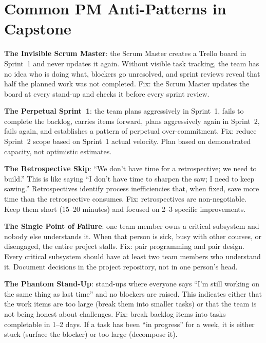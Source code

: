 \section{Common PM Anti-Patterns in Capstone}
\textbf{The Invisible Scrum Master}: the Scrum Master creates a Trello board in Sprint~1 and never updates it again. Without visible task tracking, the team has no idea who is doing what, blockers go unresolved, and sprint reviews reveal that half the planned work was not completed. Fix: the Scrum Master updates the board at every stand-up and checks it before every sprint review.

\textbf{The Perpetual Sprint~1}: the team plans aggressively in Sprint~1, fails to complete the backlog, carries items forward, plans aggressively again in Sprint~2, fails again, and establishes a pattern of perpetual over-commitment. Fix: reduce Sprint~2 scope based on Sprint~1 actual velocity. Plan based on demonstrated capacity, not optimistic estimates.

\textbf{The Retrospective Skip}: ``We don't have time for a retrospective; we need to build.'' This is like saying ``I don't have time to sharpen the saw; I need to keep sawing.'' Retrospectives identify process inefficiencies that, when fixed, save more time than the retrospective consumes. Fix: retrospectives are non-negotiable. Keep them short (15--20 minutes) and focused on 2--3 specific improvements.

\textbf{The Single Point of Failure}: one team member owns a critical subsystem and nobody else understands it. When that person is sick, busy with other courses, or disengaged, the entire project stalls. Fix: pair programming and pair design. Every critical subsystem should have at least two team members who understand it. Document decisions in the project repository, not in one person's head.

\textbf{The Phantom Stand-Up}: stand-ups where everyone says ``I'm still working on the same thing as last time'' and no blockers are raised. This indicates either that the work items are too large (break them into smaller tasks) or that the team is not being honest about challenges. Fix: break backlog items into tasks completable in 1--2 days. If a task has been ``in progress'' for a week, it is either stuck (surface the blocker) or too large (decompose it).

